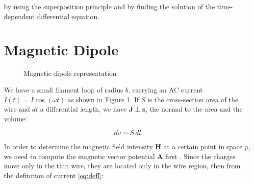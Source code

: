 by using the superposition principle and by finding the 
solution of the time-dependent differential equation.

\section{Magnetic Dipole}

\begin{figure}
    \centering
    \caption{Magnetic dipole representation}
    \label{fig:dipole}
\end{figure}

We have a small filament loop of radius \( b \), 
carrying an AC current \( I(t) = I \cos(\omega t) \) 
as shown in Figure \ref{fig:dipole}. If \( S \) is the 
cross-section area of the wire and \( dl \) a 
differential length, we have \( \mathbf{J} \perp 
\mathbf{s} \), the normal to the area and the volume:

\begin{equation}
    dv = S \, dl
    \label{eq:dvolume}
\end{equation}

In order to determine the magnetic field intensity 
\(\mathbf{H}\) at a certain point in space \( p \), 
we need to compute the magnetic vector potential 
\(\mathbf{A}\) first \cite{book-magnetism}. Since the 
charges move only in the thin wire, they are located 
only in the wire region, then from the definition of 
current \ref{eq:defI}:

